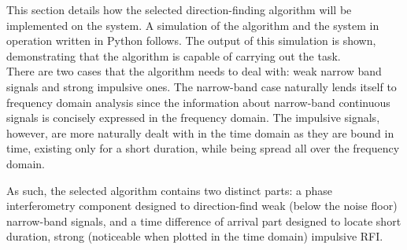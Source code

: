 This section details how the selected direction-finding algorithm will be implemented on the system. A simulation of the algorithm and the system in operation written in Python follows. The output of this simulation is shown, demonstrating that the algorithm is capable of carrying out the task.\\

There are two cases that the algorithm needs to deal with: weak narrow band signals and strong impulsive ones. The narrow-band case naturally lends itself to frequency domain analysis since the information about narrow-band continuous signals is concisely expressed in the frequency domain. The impulsive signals, however, are more naturally dealt with in the time domain as they are bound in time, existing only for a short duration, while being spread all over the frequency domain. 

As such, the selected algorithm contains two distinct parts: a phase interferometry component designed to direction-find weak (below the noise floor) narrow-band signals, and a time difference of arrival part designed to locate short duration, strong (noticeable when plotted in the time domain) impulsive RFI.

